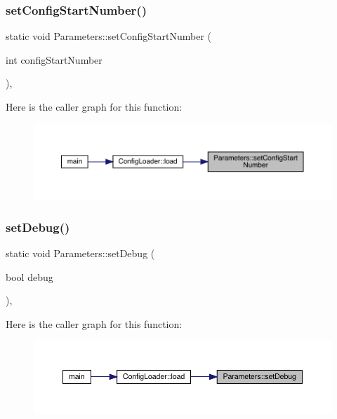 \subsubsection{\texorpdfstring{setConfigStartNumber()}{setConfigStartNumber()}}
{\footnotesize\ttfamily static void Parameters\+::set\+Config\+Start\+Number (\begin{DoxyParamCaption}\item[{int}]{config\+Start\+Number }\end{DoxyParamCaption})\hspace{0.3cm}{\ttfamily [inline]}, {\ttfamily [static]}}

Here is the caller graph for this function\+:
\nopagebreak
\begin{figure}[H]
\begin{center}
\leavevmode
\includegraphics[width=350pt]{class_parameters_a4863c437df48cd3242fdb67221a3d6ed_icgraph}
\end{center}
\end{figure}
\mbox{\label{class_parameters_a6b0d9bf17b3c8096c3454d291e086ac2}} 
\subsubsection{\texorpdfstring{setDebug()}{setDebug()}}
{\footnotesize\ttfamily static void Parameters\+::set\+Debug (\begin{DoxyParamCaption}\item[{bool}]{debug }\end{DoxyParamCaption})\hspace{0.3cm}{\ttfamily [inline]}, {\ttfamily [static]}}

Here is the caller graph for this function\+:
\nopagebreak
\begin{figure}[H]
\begin{center}
\leavevmode
\includegraphics[width=350pt]{class_parameters_a6b0d9bf17b3c8096c3454d291e086ac2_icgraph}
\end{center}
\end{figure}
\mbox{\label{class_parameters_abbcb8f09dfec507ec29caa248819522b}} 

